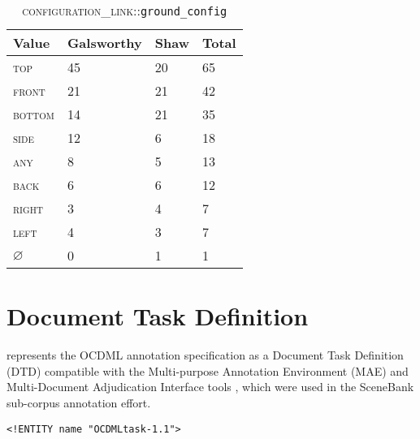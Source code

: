 \documentclass[11pt]{article}
\begin{document}
\begin{appendix}
    \begin{table}[here]
    \begin{center}
    \begin{tabular}
        {|l|l|l|l|}
        \hline  \textbf{Value} & \textbf{Galsworthy} & \textbf{Shaw} & \textbf{Total} \\
        \hline  \textsc{top} & 45 & 20 & 65    \\
        \hline  \textsc{front} & 21 & 21 & 42  \\
        \hline  \textsc{bottom} & 14 & 21 & 35 \\
        \hline  \textsc{side} & 12 & 6 & 18    \\
        \hline  \textsc{any} & 8 & 5 & 13      \\
        \hline  \textsc{back} & 6 & 6 & 12     \\
        \hline  \textsc{right} & 3 & 4 & 7     \\
        \hline  \textsc{left} & 4 & 3 & 7      \\
        \hline  $\varnothing$ & 0 & 1 & 1      \\
        \hline
    \end{tabular}
    \caption{\textsc{configuration\_link}::\texttt{ground\_config}}
    \label{tab:ground_config-counts}
    \end{center}
    \end{table}
    
    
    \clearpage
    \section{Document Task Definition} %
    \label{sec:document_task_definition}
     represents the OCDML annotation specification as a Document Task Definition (DTD) compatible with the Multi-purpose Annotation Environment (MAE) and Multi-Document Adjudication Interface tools \cite{stubbs2011mae}, which were used in the SceneBank sub-corpus annotation effort.
    \begin{figure*}[h]
	\footnotesize
        \begin{verbatim}
<!ENTITY name "OCDMLtask-1.1">


\end{verbatim}
\end{figure*}
\end{appendix}
\end{document}
